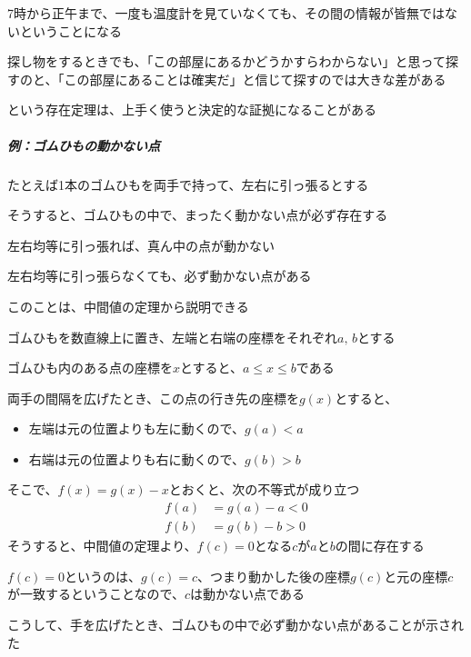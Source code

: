 \documentclass[../book_jiriki_calc]{subfiles}
\begin{document}
7時から正午まで、一度も温度計を見ていなくても、その間の情報が皆無ではないということになる

\br

探し物をするときでも、「この部屋にあるかどうかすらわからない」と思って探すのと、「この部屋にあることは確実だ」と信じて探すのでは大きな差がある

という存在定理は、上手く使うと決定的な証拠になることがある

\sectionline

\subparagraph{例：ゴムひもの動かない点}

たとえば1本のゴムひもを両手で持って、左右に引っ張るとする

そうすると、ゴムひもの中で、まったく動かない点が必ず存在する

左右均等に引っ張れば、真ん中の点が動かない

左右均等に引っ張らなくても、必ず動かない点がある

\sectionline

このことは、中間値の定理から説明できる

\br

ゴムひもを数直線上に置き、左端と右端の座標をそれぞれ$a,\,b$とする

ゴムひも内のある点の座標を$x$とすると、$a\leq x\leq b$である

\br

両手の間隔を広げたとき、この点の行き先の座標を$g(x)$とすると、
\begin{itemize}
  \item 左端は元の位置よりも左に動くので、$g(a)<a$
  \item 右端は元の位置よりも右に動くので、$g(b)>b$
\end{itemize}

そこで、$f(x)=g(x)-x$とおくと、次の不等式が成り立つ
\begin{align*}
  f(a) & = g(a) - a < 0 \\
  f(b) & = g(b) - b > 0
\end{align*}
そうすると、中間値の定理より、$f(c)=0$となる$c$が$a$と$b$の間に存在する

\br

$f(c)=0$というのは、$g(c)=c$、つまり動かした後の座標$g(c)$と元の座標$c$が一致するということなので、$c$は動かない点である

\br

こうして、手を広げたとき、ゴムひもの中で必ず動かない点があることが示された

\sectionline
\end{document}
